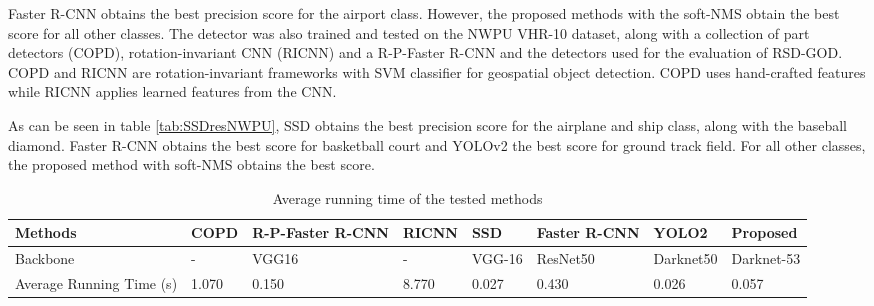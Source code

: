 Faster R-CNN obtains the best precision score for the airport class. However, the proposed methods with the soft-NMS obtain the best score for all other classes. 
The detector was also trained and tested on the NWPU VHR-10\cite{nwpu} dataset, along with a collection of part detectors (COPD)\cite{copd}, rotation-invariant CNN (RICNN)\cite{ricnn} and a R-P-Faster R-CNN\cite{rpfrcnn} and the detectors used for the evaluation of RSD-GOD. COPD and RICNN are rotation-invariant frameworks with SVM classifier for geospatial object detection. COPD uses hand-crafted features while RICNN applies learned features from the CNN.

As can be seen in table \ref{tab:SSDresNWPU}, SSD obtains the best precision score for the airplane and ship class, along with the baseball diamond. Faster R-CNN obtains the best score for basketball court and YOLOv2 the best score for ground track field. For all other classes, the proposed method with soft-NMS obtains the best score.

\begin{table}[h!]
	\centering
	\begin{tabular}{@{}llllllll@{}}
		\toprule
		Methods                  & COPD  & R-P-Faster R-CNN & RICNN & SSD    & Faster R-CNN & YOLO2     & Proposed   \\ \midrule
		Backbone                 & -     & VGG16            & -     & VGG-16 & ResNet50     & Darknet50 & Darknet-53 \\
		Average Running Time (s) & 1.070 & 0.150            & 8.770 & 0.027  & 0.430        & 0.026     & 0.057      \\ \bottomrule
	\end{tabular}
	\caption{Average running time of the tested methods}
	\label{tab:perf}
\end{table}
